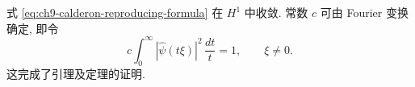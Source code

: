 \begin{Proof}
\hypertarget{chapter-09-page-224}{}

式 \eqref{eq:ch9-calderon-reproducing-formula} 在 $H^1$ 中收敛. 常数 $c$ 可由 Fourier 变换确定, 即令
\[
 c\int_0^\infty|\widehat\psi(t\xi)|^2\,\frac{dt}{t}=1,
 \qquad \xi\neq0.
\]
这完成了引理及定理的证明.
\end{Proof}

